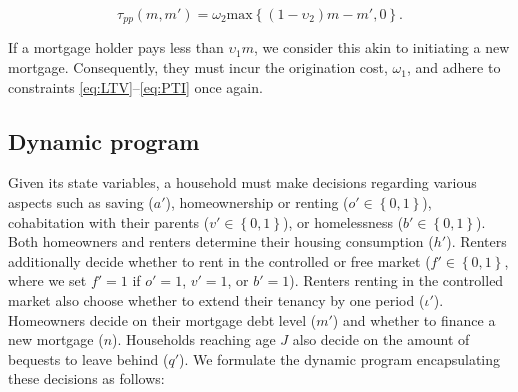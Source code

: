 \documentclass[parskip=full]{article}
\begin{document}
\begin{equation}\label{eq:prepayment_penalty}
\tau_{pp}(m,m')=\omega_{2}\mbox{max}\left\{(1-\upsilon_{2})m-m',0\right\}.
\end{equation}

\noindent If a mortgage holder pays less than $\upsilon_{1}m$, we consider this akin to initiating a new mortgage. Consequently, they must incur the origination cost, $\omega_{1}$, and adhere to constraints \eqref{eq:LTV}--\eqref{eq:PTI} once again.

\subsection{Dynamic program}\label{subsection:household_optimization}
Given its state variables, a household must make decisions regarding various aspects such as saving ($a'$), homeownership or renting ($o' \in \left\{0,1\right\}$), cohabitation with their parents ($v' \in \left\{0,1\right\}$), or homelessness ($b' \in \left\{0,1\right\}$). Both homeowners and renters determine their housing consumption ($h'$). Renters additionally decide whether to rent in the controlled or free market ($f' \in \left\{0,1\right\}$, where we set $f'=1$ if $o'=1$, $v'=1$, or $b'=1$). Renters renting in the controlled market also choose whether to extend their tenancy by one period ($\iota'$). Homeowners decide on their mortgage debt level ($m'$) and whether to finance a new mortgage ($n$). Households reaching age $J$ also decide on the amount of bequests to leave behind ($q'$). We formulate the dynamic program encapsulating these decisions as follows:
\end{document}
